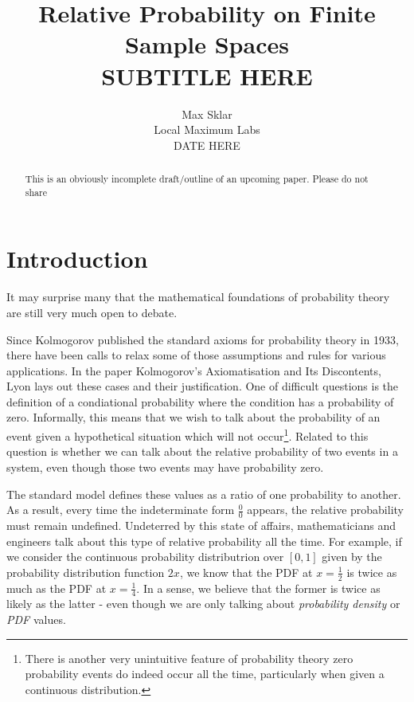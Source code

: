 \documentclass[twoside]{article}
\begin{document}
\parindent=0in
\parskip=12pt


\title{
  Relative Probability on Finite Sample Spaces \\
  \large{
    SUBTITLE HERE
  }
}

\author{Max Sklar\\ Local Maximum Labs \\ DATE HERE}
\date{}

\maketitle
\thispagestyle{empty}

\begin{abstract}
This is an obviously incomplete draft/outline of an upcoming paper. Please do not share
\end{abstract}

\section{Introduction}

It may surprise many that the mathematical foundations of probability theory are still very much open to debate.

Since Kolmogorov published the standard axioms for probability theory in 1933, there have been calls to relax some of those assumptions and rules for various applications. In the paper Kolmogorov's Axiomatisation and Its Discontents\cite{lyon}, Lyon lays out these cases and their justification. One of difficult questions is the definition of a condiational probability where the condition has a probability of zero. Informally, this means that we wish to talk about the probability of an event given a hypothetical situation which will not occur\footnote{There is another very unintuitive feature of probability theory zero probability events do indeed occur all the time, particularly when given a continuous distribution.}. Related to this question is whether we can talk about the relative probability of two events in a system, even though those two events may have probability zero.

The standard model defines these values as a ratio of one probability to another. As a result, every time the indeterminate form \(\frac{0}{0}\) appears, the relative probability must remain undefined. Undeterred by this state of affairs, mathematicians and engineers talk about this type of relative probability all the time. For example, if we consider the continuous probability distributrion over \([0, 1]\) given by the probability distribution function \(2x\), we know that the PDF at \(x = \frac{1}{2}\) is twice as much as the PDF at \(x = \frac{1}{4}\). In a sense, we believe that the former is twice as likely as the latter - even though we are only talking about \textit{probability density} or \textit{PDF} values.
\end{document}

